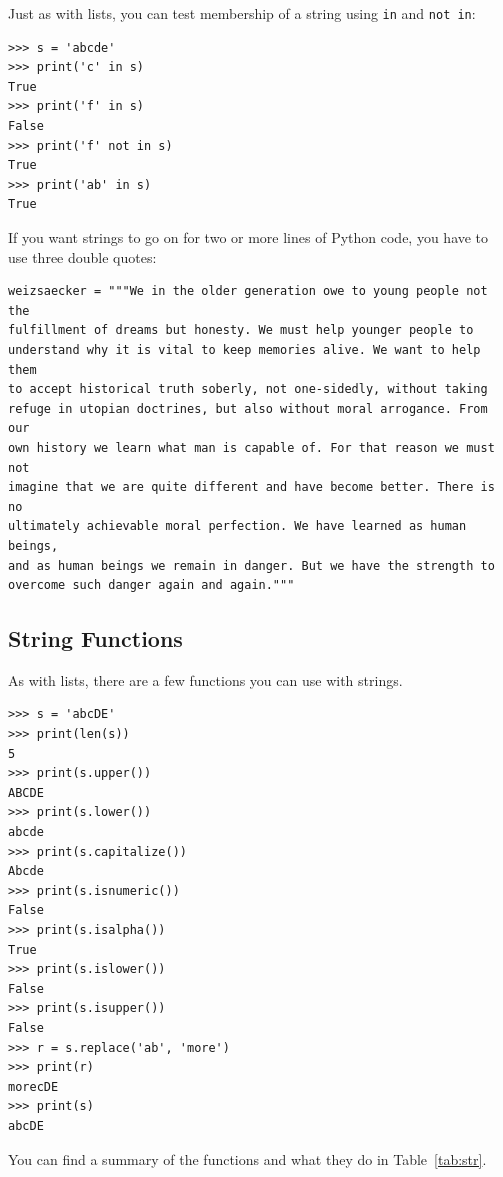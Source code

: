 \documentclass[11pt]{cselabheader}
\begin{document}
Just as with lists, you can test membership of a string using \lstinline!in! and
\lstinline!not in!:
\begin{lstlisting}[style=ipython]
>>> s = 'abcde'
>>> print('c' in s)
True
>>> print('f' in s)
False
>>> print('f' not in s)
True
>>> print('ab' in s)
True
\end{lstlisting}

If you want strings to go on for two or more lines of Python code, you have to use three double
quotes:
\begin{lstlisting}[caption={Excerpt of Richard von Weizs\"{a}cker's speech in
the Bundestag to commemorate the 40th anniversary of the end of World War II.}]
weizsaecker = """We in the older generation owe to young people not the 
fulfillment of dreams but honesty. We must help younger people to 
understand why it is vital to keep memories alive. We want to help them 
to accept historical truth soberly, not one-sidedly, without taking 
refuge in utopian doctrines, but also without moral arrogance. From our
own history we learn what man is capable of. For that reason we must not
imagine that we are quite different and have become better. There is no
ultimately achievable moral perfection. We have learned as human beings,
and as human beings we remain in danger. But we have the strength to 
overcome such danger again and again."""
\end{lstlisting}

\subsection{String Functions}

As with lists, there are a few functions you can use with strings.

\begin{lstlisting}[style=ipython]
>>> s = 'abcDE'
>>> print(len(s))
5
>>> print(s.upper())
ABCDE
>>> print(s.lower())
abcde
>>> print(s.capitalize())
Abcde
>>> print(s.isnumeric())
False
>>> print(s.isalpha())
True
>>> print(s.islower())
False
>>> print(s.isupper())
False
>>> r = s.replace('ab', 'more')
>>> print(r)
morecDE
>>> print(s)
abcDE
\end{lstlisting}

You can find a summary of the functions and what they do in Table~\ref{tab:str}.
\end{document}

